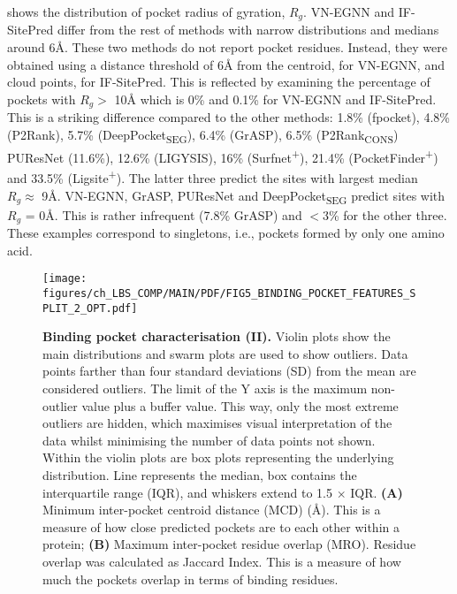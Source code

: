  shows the distribution of pocket radius of gyration, $R_{g}$. VN-EGNN and IF-SitePred differ from the rest of methods with narrow distributions and medians around 6\AA{}. These two methods do not report pocket residues. Instead, they were obtained using a distance threshold of 6\AA{} from the centroid, for VN-EGNN, and cloud points, for IF-SitePred. This is reflected by examining the percentage of pockets with $R_{g} >$ 10\AA{} which is 0\% and 0.1\% for VN-EGNN and IF-SitePred. This is a striking difference compared to the other methods: 1.8\% (fpocket), 4.8\% (P2Rank), 5.7\% (DeepPocket\textsubscript{SEG}), 6.4\% (GrASP), 6.5\% (P2Rank\textsubscript{CONS}) PUResNet (11.6\%), 12.6\% (LIGYSIS), 16\% (Surfnet\textsuperscript{+}), 21.4\% (PocketFinder\textsuperscript{+}) and 33.5\% (Ligsite\textsuperscript{+}). The latter three predict the sites with largest median $R_{g} \approx$ 9\AA{}. VN-EGNN, GrASP, PUResNet and DeepPocket\textsubscript{SEG} predict sites with $R_{g}$ = 0\AA{}. This is rather infrequent (7.8\% GrASP) and $<$3\% for the other three. These examples correspond to singletons, i.e., pockets formed by only one amino acid.

\begin{figure}[ht!]
    \centering
    \texttt{[image: figures/ch\_LBS\_COMP/MAIN/PDF/FIG5\_BINDING\_POCKET\_FEATURES\_SPLIT\_2\_OPT.pdf]}
    \caption[Binding pocket characterisation (II)]{\textbf{Binding pocket characterisation (II).} Violin plots show the main distributions and swarm plots are used to show outliers. Data points farther than four standard deviations (SD) from the mean are considered outliers. The limit of the Y axis is the maximum non-outlier value plus a buffer value. This way, only the most extreme outliers are hidden, which maximises visual interpretation of the data whilst minimising the number of data points not shown. Within the violin plots are box plots representing the underlying distribution. Line represents the median, box contains the interquartile range (IQR), and whiskers extend to 1.5 $\times$ IQR. \textbf{(A)} Minimum inter-pocket centroid distance (MCD) (\AA{}). This is a measure of how close predicted pockets are to each other within a protein; \textbf{(B)} Maximum inter-pocket residue overlap (MRO). Residue overlap was calculated as Jaccard Index. This is a measure of how much the pockets overlap in terms of binding residues.}
    \label{fig:pocket_features_2}
\end{figure}

